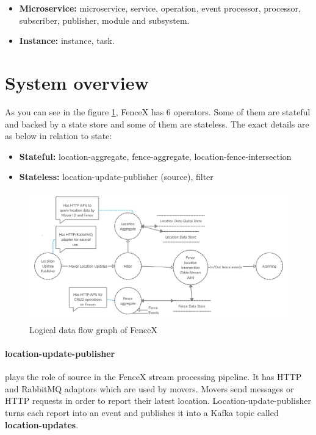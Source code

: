\documentclass[a4]{report}
\begin{document}
    \begin{itemize}
        \item \textbf{Microservice:} microservice, service, operation, event processor, processor, subscriber,
        publisher, module and subsystem.
        \item \textbf{Instance:} instance, task.
    \end{itemize}


    \section{System overview}
    As you can see in the figure \ref{fig:logical-dfg}, FenceX has 6 operators.
    Some of them are stateful and backed by a state store and some of them are stateless.
    The exact details are as below in relation to state:

    \begin{itemize}
        \item \textbf{Stateful:} location-aggregate, fence-aggregate, location-fence-intersection
        \item \textbf{Stateless:} location-update-publisher (source), filter
    \end{itemize}

    \begin{figure}[ht]
        \centering
        \caption{Logical data flow graph of FenceX}
        \label{fig:logical-dfg}
        \includegraphics[width=\linewidth ,scale=0.2]{images/logical-data-flow-diagram.png}
    \end{figure}

    \paragraph{location-update-publisher} plays the role of source in the FenceX stream processing pipeline.
    It has HTTP and RabbitMQ\cite{rabbitMq} adaptors which are used by movers.
    Movers send messages or HTTP requests in order to report their latest location.
    Location-update-publisher turns each report into an event and publishes it into a Kafka topic called
    \textbf{location-updates}.
\end{document}
